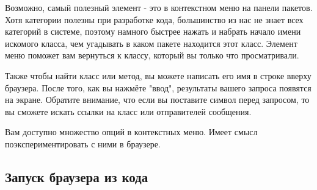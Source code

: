\documentclass[a4paper,10pt,twoside]{book}
\begin{document}
Возможно, самый полезный элемент - это  в контекстном меню на панели пакетов. Хотя категории полезны при разработке кода, большинство из нас не знает всех категорий в системе, поэтому намного быстрее нажать  и набрать начало имени искомого класса, чем угадывать в каком пакете находится этот класс. 
Элемент меню  поможет вам вернуться к классу, который вы только что просматривали.


Также чтобы найти класс или метод, вы можете написать его имя в строке вверху браузера. После того, как вы нажмёте "ввод", результаты вашего запроса появятся на экране. Обратите внимание, что если вы поставите символ \ct{#} перед запросом, то вы сможете искать ссылки на класс или отправителей сообщения.


Вам доступно множество опций в контекстных меню. Имеет смысл поэкспериментировать с ними в браузере.


\subsection{Запуск браузера из кода}
\end{document}
